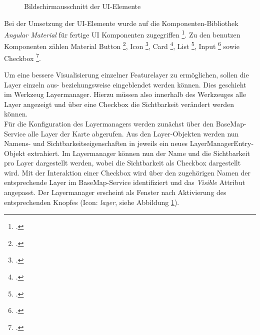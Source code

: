 \begin{figure}[H]
	\caption{Bildschirmausschnitt der UI-Elemente}
	\label{img:toolset}
\end{figure}

Bei der Umsetzung der UI-Elemente wurde auf die Komponenten-Bibliothek \emph{Angular Material} für fertige UI Komponenten zugegriffen \footcite{team_angular_material}.
Zu den benutzen Komponenten zählen Material Button \footcite{team_angular_material_button}, Icon \footcite{team_angular_material_icon}, Card \footcite{team_angular_material_card}, List \footcite{team_angular_material_list}, Input \footcite{team_angular_material_input} sowie Checkbox \footcite{team_angular_material_checkbox}.

Um eine bessere Visualisierung einzelner Featurelayer zu ermöglichen, sollen die Layer einzeln aus- beziehungsweise eingeblendet werden können.
Dies geschieht im Werkzeug Layermanager.
Hierzu müssen also innerhalb des Werkzeuges alle Layer angezeigt und über eine Checkbox die Sichtbarkeit verändert werden können.\\
Für die Konfiguration des Layermanagers werden zunächst über den BaseMap-Service alle Layer der Karte abgerufen.
Aus den Layer-Objekten werden nun Namens- und Sichtbarkeitseigenschaften in jeweils ein neues LayerManagerEntry-Objekt extrahiert.
Im Layermanager können nun der Name und die Sichtbarkeit pro Layer dargestellt werden, wobei die Sichtbarkeit als Checkbox dargestellt wird.
Mit der Interaktion einer Checkbox wird über den zugehörigen Namen der entsprechende Layer im BaseMap-Service identifiziert und das \emph{Visible} Attribut angepasst.
Der Layermanager erscheint als Fenster nach Aktivierung des entsprechenden Knopfes (Icon: \emph{layer}, siehe Abbildung \ref{img:toolset}).

